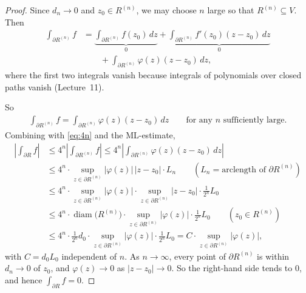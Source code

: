 \documentclass[11pt]{article}
\theoremstyle{plain}
\theoremstyle{definition}
\theoremstyle{remark}
\numberwithin{equation}{section}
\newcommand{\be}{\begin{eqnarray}}
\newcommand{\ee}{\end{eqnarray}}
\begin{document}
\begin{proof}
\noindent
\begin{minipage}[c]{0.62\textwidth}
Since $d_n\to0$ and $z_0\in R^{(n)}$, we may choose $n$ large so that
$R^{(n)}\subseteq V$. Then
\begin{align*}
 \int_{\partial R^{(n)}}f
 &=\underbrace{\int_{\partial R^{(n)}}f(z_0)\,dz}_{0}
 +\underbrace{\int_{\partial R^{(n)}}f'(z_0)(z-z_0)\,dz}_{0}\\
 &\qquad+\int_{\partial R^{(n)}}\varphi(z)(z-z_0)\,dz,
\end{align*}
where the first two integrals vanish because integrals of polynomials
over closed paths vanish (Lecture~11).
\end{minipage}\hfill
\begin{minipage}[c]{0.34\textwidth}
\centering
{}
\end{minipage}

So
\be
 \int_{\partial R^{(n)}}f=\int_{\partial R^{(n)}}\varphi(z)(z-z_0)\,dz
 \qquad\text{for any $n$ sufficiently large.}
\ee
Combining with \eqref{eq:4n} and the ML-estimate,
\begin{align*}
 \left|\int_{\partial R}f\right|
 &\leq4^n\left|\int_{\partial R^{(n)}}f\right|
 \leq4^n\left|\int_{\partial R^{(n)}}\varphi(z)(z-z_0)\,dz\right|\\
 &\leq4^n\cdot\sup_{z\in\partial R^{(n)}}\bigl|\varphi(z)\bigr|\,|z-z_0|\cdot L_n
 \qquad(L_n=\text{arclength of }\partial R^{(n)})\\
 &\leq4^n\cdot\sup_{z\in\partial R^{(n)}}|\varphi(z)|\cdot\sup_{z\in\partial R^{(n)}}|z-z_0|\cdot\frac1{2^n}L_0\\
 &\leq4^n\cdot\operatorname{diam}\bigl(R^{(n)}\bigr)\cdot\sup_{z\in\partial R^{(n)}}|\varphi(z)|\cdot\frac1{2^n}L_0
 \qquad(z_0\in R^{(n)})\\
 &\leq4^n\cdot\frac1{2^n}d_0\cdot\sup_{z\in\partial R^{(n)}}|\varphi(z)|\cdot\frac1{2^n}L_0
 =C\cdot\sup_{z\in\partial R^{(n)}}|\varphi(z)|,
\end{align*}
with $C=d_0L_0$ independent of $n$. As $n\to\infty$, every point of
$\partial R^{(n)}$ is within $d_n\to0$ of $z_0$, and $\varphi(z)\to0$ as
$|z-z_0|\to0$. So the right-hand side tends to $0$, and hence
$\int_{\partial R}f=0$.
\end{proof}
\end{document}
